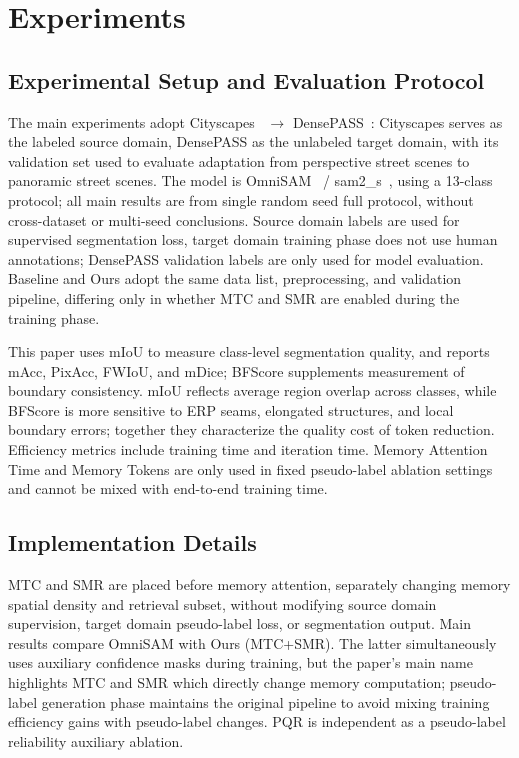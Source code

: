 \section{Experiments}
\label{sec:experiments}

\subsection{Experimental Setup and Evaluation Protocol}
The main experiments adopt Cityscapes~\cite{cordts2016cityscapes} $\rightarrow$ DensePASS~\cite{ma2021densepass}: Cityscapes serves as the labeled source domain, DensePASS as the unlabeled target domain, with its validation set used to evaluate adaptation from perspective street scenes to panoramic street scenes. The model is OmniSAM~\cite{zhong2025omnisam} / sam2\_s~\cite{ravi2025sam2}, using a 13-class protocol; all main results are from single random seed full protocol, without cross-dataset or multi-seed conclusions. Source domain labels are used for supervised segmentation loss, target domain training phase does not use human annotations; DensePASS validation labels are only used for model evaluation. Baseline and Ours adopt the same data list, preprocessing, and validation pipeline, differing only in whether MTC and SMR are enabled during the training phase.

This paper uses mIoU to measure class-level segmentation quality, and reports mAcc, PixAcc, FWIoU, and mDice; BFScore supplements measurement of boundary consistency. mIoU reflects average region overlap across classes, while BFScore is more sensitive to ERP seams, elongated structures, and local boundary errors; together they characterize the quality cost of token reduction. Efficiency metrics include training time and iteration time. Memory Attention Time and Memory Tokens are only used in fixed pseudo-label ablation settings and cannot be mixed with end-to-end training time.

\subsection{Implementation Details}
MTC and SMR are placed before memory attention, separately changing memory spatial density and retrieval subset, without modifying source domain supervision, target domain pseudo-label loss, or segmentation output. Main results compare OmniSAM with Ours (MTC+SMR). The latter simultaneously uses auxiliary confidence masks during training, but the paper's main name highlights MTC and SMR which directly change memory computation; pseudo-label generation phase maintains the original pipeline to avoid mixing training efficiency gains with pseudo-label changes. PQR is independent as a pseudo-label reliability auxiliary ablation.

